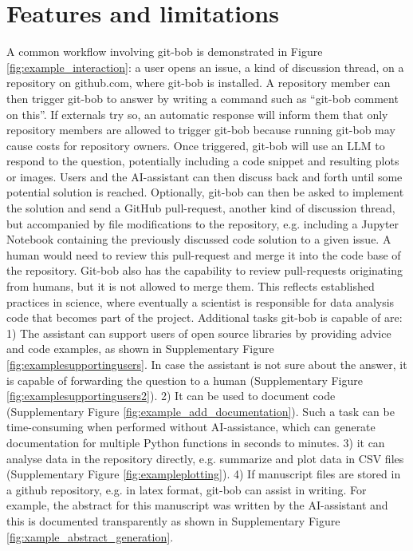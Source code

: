 \documentclass[times, twoside]{zHenriquesLab-StyleBioRxiv}
\begin{document}

\section*{Features and limitations}

A common workflow involving git-bob is demonstrated in Figure \ref{fig:example_interaction}: a user opens an issue, a kind of discussion thread, on a repository on github.com, where git-bob is installed. A repository member can then trigger git-bob to answer by writing a command such as ``git-bob comment on this''. If externals try so, an automatic response will inform them that only repository members are allowed to trigger git-bob because running git-bob may cause costs for repository owners. Once triggered, git-bob will use an LLM to respond to the question, potentially including a code snippet and resulting plots or images. Users and the AI-assistant can then discuss back and forth until some potential solution is reached. Optionally, git-bob can then be asked to implement the solution and send a GitHub pull-request, another kind of discussion thread, but accompanied by file modifications to the repository, e.g. including a Jupyter Notebook containing the previously discussed code solution to a given issue. A human would need to review this pull-request and merge it into the code base of the repository. Git-bob also has the capability to review pull-requests originating from humans, but it is not allowed to merge them. This reflects established practices in science, where eventually a scientist is responsible for data analysis code that becomes part of the project. Additional tasks git-bob is capable of are: 1) The assistant can support users of open source libraries by providing advice and code examples, as shown in Supplementary Figure \ref{fig:examplesupportingusers}. In case the assistant is not sure about the answer, it is capable of forwarding the question to a human (Supplementary Figure \ref{fig:examplesupportingusers2}). 2) It can be used to document code (Supplementary Figure \ref{fig:example_add_documentation}). Such a task can be time-consuming when performed without AI-assistance, which can generate documentation for multiple Python functions in seconds to minutes. 3) it can analyse data in the repository directly, e.g. summarize and plot data in CSV files (Supplementary Figure \ref{fig:exampleplotting}). 4) If manuscript files are stored in a github repository, e.g. in latex format, git-bob can assist in writing. For example, the abstract for this manuscript was written by the AI-assistant and this is documented transparently as shown in Supplementary Figure \ref{fig:xample_abstract_generation}.
\end{document}
